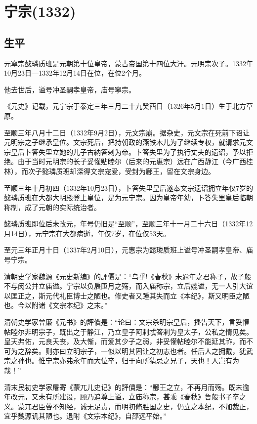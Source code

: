 
\section{宁宗\tiny(1332)}

\subsection{生平}

元寧宗懿璘质班是元朝第十位皇帝，蒙古帝国第十四位大汗。元明宗次子。1332年10月23日—1332年12月14日在位，在位2个月。

他去世后，谥号冲圣嗣孝皇帝，庙号寧宗。

《元史》记载，元宁宗于泰定三年三月二十九癸酉日（1326年5月1日）生于北方草原。

至顺三年八月十二日（1332年9月2日），元文宗崩。据杂史，元文宗在死前下诏让元明宗之子继承皇位。文宗死后，把持朝政的燕铁木儿为了继续专权，就请求元文宗皇后卜答失里立她的儿子古納答剌为帝。卜答失里为了执行丈夫的遗诏，予以拒绝。由于当时元明宗的长子妥懽贴睦尔（后来的元惠宗）远在广西静江（今广西桂林），而次子懿璘质班却深得文宗宠爱，受封为鄜王，留在文宗身边。

至顺三年十月初四（1332年10月23日），卜答失里皇后遂奉文宗遗诏拥立年仅7岁的懿璘质班在大都大明殿登上皇位，是为元宁宗。因为皇帝年幼，卜答失里皇后临朝称制，成了元朝的实际统治者。

懿璘质班即位后未改元，年号仍旧是“至顺”，至顺三年十一月二十六日（1332年12月14日），元宁宗在大都病逝，年仅7岁，在位仅53天。

至元三年正月十日（1337年2月10日），元惠宗为懿璘质班上谥号冲圣嗣孝皇帝、庙号宁宗。

清朝史学家魏源《元史新编》的評價是：“乌乎!《春秋》未逾年之君称子，故子般不与闵公并立庙谥。宁宗以负扆匝月之殇，而入庙称宗，立后媲谥，无一人引大谊以匡正之，斯元代礼臣博士之陋也。修史者又踵其失而立《本纪》，斯又明臣之陋也。今以附诸《文宗本纪》之末。”

清朝史学家曾廉《元书》的評價是：“论曰：文宗杀明宗皇后，播告天下，言妥懽帖睦尔非明宗子，既出之于静江，乃立皇子阿剌忒答剌为皇太子，公私之情见矣。皇天弗佑，元良夭丧，及大惭，而爱其少子之弱，非妥懽帖睦尔不能延其祚，而不可为之辞矣。则亦曰立明宗子，一似以明其固让之初志也者。任后人之拥戴，犹武宗之孙也。惟宁宗亦弗永年而大位卒，归于向所猜忌之兄子，天也！人岂有为哉！”

清末民初史学家屠寄《蒙兀儿史记》的評價是：“鄜王之立，不再月而殇。既未逾年改元，又未有所建设，顾乃追尊上谥，立庙称宗，甚乖《春秋》鲁般书子卒之义。蒙兀君臣瞢不知经，诚无足责，而明初脩胜国之史，仍立之本纪，不加裁正，宜乎魏源讥其陋也。退附《文宗本纪》，自邵远平始。”

